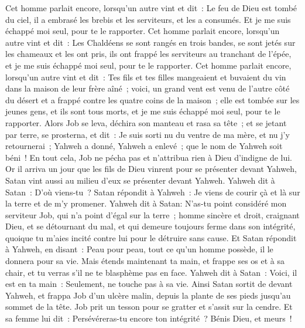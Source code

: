 \begin{multicols}{2}
Cet homme parlait encore, lorsqu'un autre vint et dit~: Le feu de Dieu est tombé du ciel, il a embrasé les brebis et les serviteurs, et les a consumés. Et je me suis échappé moi seul, pour te le rapporter.
Cet homme parlait encore, lorsqu'un autre vint et dit~: Les Chaldéens se sont rangés en trois bandes, se sont jetés sur les chameaux et les ont pris, ils ont frappé les serviteurs au tranchant de l'épée, et je me suis échappé moi seul, pour te le rapporter.
Cet homme parlait encore, lorsqu'un autre vint et dit~: Tes fils et tes filles mangeaient et buvaient du vin dans la maison de leur frère aîné~;
voici, un grand vent est venu de l'autre côté du désert et a frappé contre les quatre coins de la maison~; elle est tombée sur les jeunes gens, et ils sont tous morts, et je me suis échappé moi seul, pour te le rapporter.
Alors Job se leva, déchira son manteau et rasa sa tête~; et se jetant par terre, se prosterna,
et dit~: Je suis sorti nu du ventre de ma mère, et nu j'y retournerai~; Yahweh a donné, Yahweh a enlevé~; que le nom de Yahweh soit béni~!
En tout cela, Job ne pécha pas et n'attribua rien à Dieu d'indigne de lui.
\VerseOne{}Or il arriva un jour que les fils de Dieu vinrent pour se présenter devant Yahweh, Satan vint aussi au milieu d'eux se présenter devant Yahweh.
Yahweh dit à Satan~: D'où viens-tu~? Satan répondit à Yahweh~: Je viens de courir çà et là sur la terre et de m'y promener.
Yahweh dit à Satan: N'as-tu point considéré mon serviteur Job, qui n'a point d'égal sur la terre~; homme sincère et droit, craignant Dieu, et se détournant du mal, et qui demeure toujours ferme dans son intégrité, quoique tu m'aies incité contre lui pour le détruire sans cause.
Et Satan répondit à Yahweh, en disant~: Peau pour peau, tout ce qu'un homme possède, il le donnera pour sa vie.
Mais étends maintenant ta main, et frappe ses os et à sa chair, et tu verras s'il ne te blasphème pas en face.
Yahweh dit à Satan~: Voici, il est en ta main~: Seulement, ne touche pas à sa vie.
Ainsi Satan sortit de devant Yahweh, et frappa Job d'un ulcère malin, depuis la plante de ses pieds jusqu'au sommet de la tête.
Job prit un tesson pour se gratter et s'assit sur la cendre.
Et sa femme lui dit~: Persévéreras-tu encore ton intégrité~? Bénis Dieu, et meurs~!

\end{multicols}
